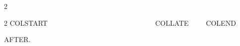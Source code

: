   \ifx\testcase\testmcolx\else\ifdefined\testmulticols\begin{multicols}{2}\fi\fi
  \ifx\testcase\testmcol\begin{multicols}{2}\fi
  COLSTART\ \filler\ \filler\
  \filler\ \filler\ \filler\ \filler\ \filler\ \filler\ \filler\ \filler\ \filler\
  \filler\ \filler\ \filler\ \filler\ \filler\ \filler\ \filler\ \filler\ \filler\
  \filler\ \filler\ \filler\ \filler\ \filler\ \filler\ \filler\ \filler\ \filler\
  \filler\ COLLATE\
  \filler\ \filler\ \filler\ \filler\ COLEND
  \ifx\testcase\testmcol\end{multicols}\fi
  \ifx\testcase\testmcolx\else\ifdefined\testmulticols\end{multicols}\fi\fi
  AFTER.
\fi\fi\fi\fi\fi\fi\fi\fi\fi
\makeatother
